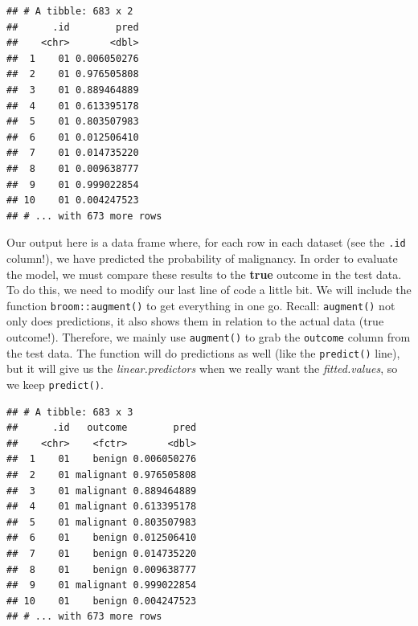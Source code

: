 \documentclass[]{article}
\newenvironment{Shaded}{\begin{snugshade}}{\end{snugshade}}
\newcommand{\KeywordTok}[1]{\textcolor[rgb]{0.13,0.29,0.53}{\textbf{#1}}}
\newcommand{\DataTypeTok}[1]{\textcolor[rgb]{0.13,0.29,0.53}{#1}}
\newcommand{\StringTok}[1]{\textcolor[rgb]{0.31,0.60,0.02}{#1}}
\newcommand{\OperatorTok}[1]{\textcolor[rgb]{0.81,0.36,0.00}{\textbf{#1}}}
\newcommand{\NormalTok}[1]{#1}
\begin{document}
\begin{verbatim}
## # A tibble: 683 x 2
##      .id        pred
##    <chr>       <dbl>
##  1    01 0.006050276
##  2    01 0.976505808
##  3    01 0.889464889
##  4    01 0.613395178
##  5    01 0.803507983
##  6    01 0.012506410
##  7    01 0.014735220
##  8    01 0.009638777
##  9    01 0.999022854
## 10    01 0.004247523
## # ... with 673 more rows
\end{verbatim}

Our output here is a data frame where, for each row in each dataset (see
the \texttt{.id} column!), we have predicted the probability of
malignancy. In order to evaluate the model, we must compare these
results to the \textbf{true} outcome in the test data. To do this, we
need to modify our last line of code a little bit. We will include the
function \texttt{broom::augment()} to get everything in one go. Recall:
\texttt{augment()} not only does predictions, it also shows them in
relation to the actual data (true outcome!). Therefore, we mainly use
\texttt{augment()} to grab the \texttt{outcome} column from the test
data. The function will do predictions as well (like the
\texttt{predict()} line), but it will give us the
\emph{linear.predictors} when we really want the \emph{fitted.values},
so we keep \texttt{predict()}.

\begin{Shaded}
\end{Shaded}

\begin{verbatim}
## # A tibble: 683 x 3
##      .id   outcome        pred
##    <chr>    <fctr>       <dbl>
##  1    01    benign 0.006050276
##  2    01 malignant 0.976505808
##  3    01 malignant 0.889464889
##  4    01 malignant 0.613395178
##  5    01 malignant 0.803507983
##  6    01    benign 0.012506410
##  7    01    benign 0.014735220
##  8    01    benign 0.009638777
##  9    01 malignant 0.999022854
## 10    01    benign 0.004247523
## # ... with 673 more rows
\end{verbatim}
\end{document}
